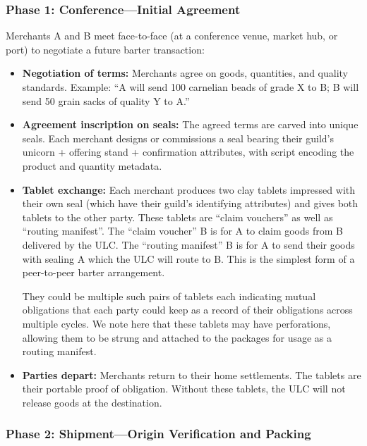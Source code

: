 \documentclass[12pt]{article}
\begin{document}
\subsubsection{Phase 1: Conference—Initial Agreement}

Merchants A and B meet face-to-face (at a conference venue, market hub, or port) to
negotiate a future barter transaction:

\begin{itemize}
\item \textbf{Negotiation of terms:} Merchants agree on goods, quantities, and
quality standards. Example: ``A will send 100 carnelian beads of grade X to B;
B will send 50 grain sacks of quality Y to A.''

\item \textbf{Agreement inscription on seals:} The agreed terms are carved into
unique seals. Each merchant designs or commissions a seal bearing their guild's
unicorn + offering stand + confirmation attributes, with script encoding the
product and quantity metadata.

\item \textbf{Tablet exchange:} Each merchant produces two clay tablets impressed
with their own seal (which have their guild's identifying attributes) and gives both
tablets to the other party. These tablets are ``claim vouchers'' as well as ``routing
manifest''. The ``claim voucher'' B is for A to claim goods from B delivered by the ULC.
The ``routing manifest'' B is for A to send their goods with sealing A which the ULC will
route to B.  This is the simplest form of a peer-to-peer barter arrangement.

They could be multiple such pairs of tablets each indicating mutual obligations that
each party could keep as a record of their obligations across multiple cycles.
We note here that these tablets may have perforations, allowing them to be strung
and attached to the packages for usage as a routing manifest.

\item \textbf{Parties depart:} Merchants return to their home settlements. The
tablets are their portable proof of obligation. Without these tablets, the ULC will
not release goods at the destination.
\end{itemize}

\subsubsection{Phase 2: Shipment—Origin Verification and Packing}
\end{document}
